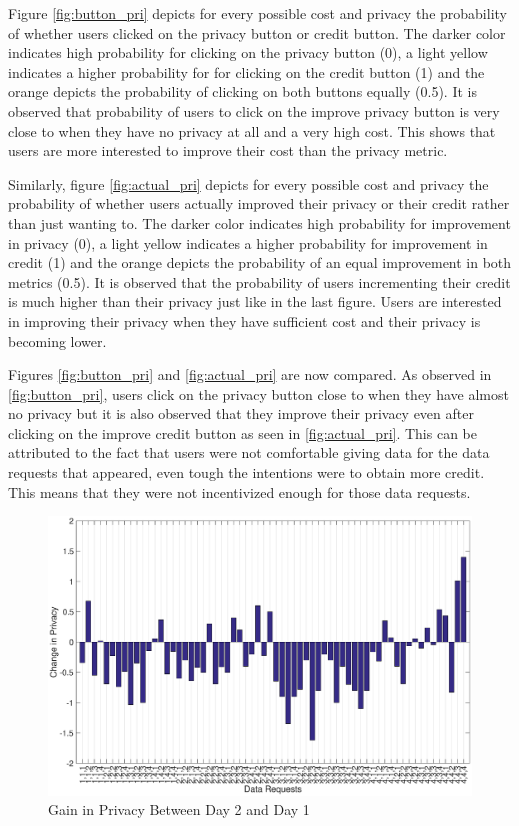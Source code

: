 Figure \ref{fig:button_pri} depicts for every possible cost and privacy the probability of whether users clicked on the privacy button or credit button. The darker color indicates high probability for clicking on the privacy button (0), a light yellow indicates a higher probability for for clicking on the credit button (1) and the orange depicts the probability of clicking on both buttons equally (0.5). It is observed that probability of users to click on the improve privacy button is very close to when they have no privacy at all and a very high cost. This shows that users are more interested to improve their cost than the privacy metric. 

Similarly, figure \ref{fig:actual_pri} depicts for every possible cost and privacy the probability of whether users actually improved their privacy or their credit rather than just wanting to. The darker color indicates high probability for improvement in privacy (0), a light yellow indicates a higher probability for improvement in credit (1) and the orange depicts the probability of an equal improvement in both metrics (0.5). It is observed that the probability of users incrementing their credit is much higher than their privacy just like in the last figure. Users are interested in improving their privacy when they have sufficient cost
and their privacy is becoming lower.

Figures \ref{fig:button_pri} and \ref{fig:actual_pri} are now compared. As observed in \ref{fig:button_pri}, users click on the privacy button close to when they have almost no privacy but it is also observed that they improve their privacy even after clicking on the improve credit button as seen in \ref{fig:actual_pri}. This can be attributed to the fact that users were not comfortable giving data for the data requests that appeared, even tough the intentions were to obtain more credit. This means that they were not incentivized enough for those data requests.


\begin{figure}[ht!]
\centering
\includegraphics[width=\textwidth]{./images/day2_day1}
\caption{Gain in Privacy Between Day 2 and Day 1}
\label{fig:day2_day1}
\end{figure}

